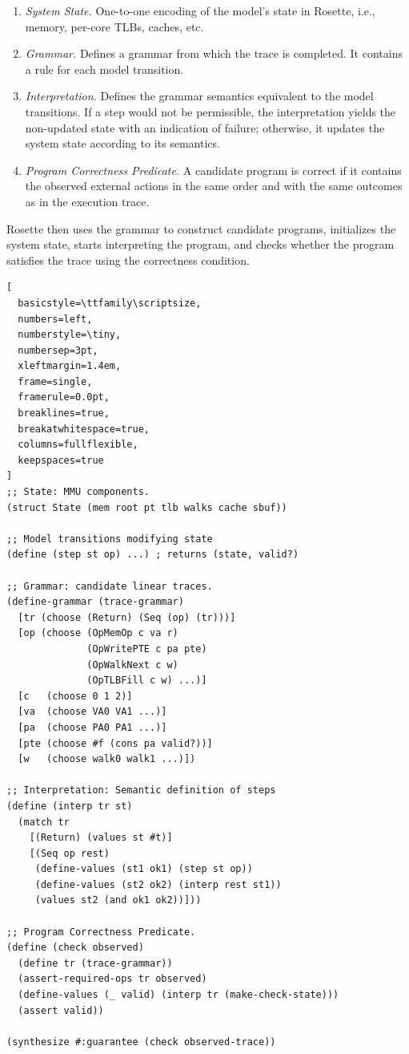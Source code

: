 \begin{enumerate}[topsep=0pt, leftmargin=1.5em]
 \item \emph{System State.} One-to-one encoding of the model's state in Rosette, i.e., memory, per-core TLBs, caches, etc. 
 \item \emph{Grammar.} Defines a grammar from which the trace is completed. It contains a rule for each model transition. 
 \item \emph{Interpretation.} Defines the grammar semantics equivalent to the model transitions. If a step would not be permissible, the interpretation yields the non-updated state with an indication of failure; otherwise, it updates the system state according to its semantics.
 \item \emph{Program Correctness Predicate.} A candidate program is correct if it contains the observed external actions in the same order and with the same outcomes as in the execution trace.
\end{enumerate}
Rosette then uses the grammar to construct candidate programs, initializes the system state, starts interpreting the program, and checks whether the program satisfies the trace using the correctness condition.

\begin{lstfloat}[t]
\begin{lstlisting}[
  basicstyle=\ttfamily\scriptsize,
  numbers=left,
  numberstyle=\tiny,
  numbersep=3pt,
  xleftmargin=1.4em,
  frame=single,
  framerule=0.0pt,
  breaklines=true,
  breakatwhitespace=true,
  columns=fullflexible,
  keepspaces=true
]
;; State: MMU components.
(struct State (mem root pt tlb walks cache sbuf))

;; Model transitions modifying state
(define (step st op) ...) ; returns (state, valid?)

;; Grammar: candidate linear traces.
(define-grammar (trace-grammar)
  [tr (choose (Return) (Seq (op) (tr)))]
  [op (choose (OpMemOp c va r)
              (OpWritePTE c pa pte)
              (OpWalkNext c w)
              (OpTLBFill c w) ...)]
  [c   (choose 0 1 2)]
  [va  (choose VA0 VA1 ...)]
  [pa  (choose PA0 PA1 ...)]
  [pte (choose #f (cons pa valid?))]
  [w   (choose walk0 walk1 ...)])

;; Interpretation: Semantic definition of steps
(define (interp tr st)
  (match tr
    [(Return) (values st #t)]
    [(Seq op rest)
     (define-values (st1 ok1) (step st op))
     (define-values (st2 ok2) (interp rest st1))
     (values st2 (and ok1 ok2))]))

;; Program Correctness Predicate.
(define (check observed)
  (define tr (trace-grammar))
  (assert-required-ops tr observed)
  (define-values (_ valid) (interp tr (make-check-state)))
  (assert valid))

(synthesize #:guarantee (check observed-trace))
\end{lstlisting}
\caption{Simplified Rosette encoding for trace validation. The grammar expresses a linear sequence of model actions; the correctness condition mandates the ordering of observed events and asserts that the model accepts the interpretation.}
\label{lst:analysis:rosette}
\end{lstfloat}


